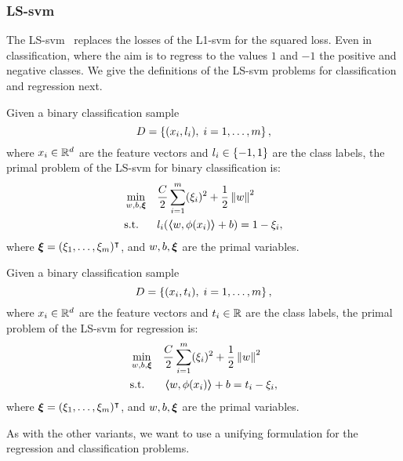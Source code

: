 \subsubsection*{LS-\acrshort{svm}}
%
The LS-\acrshort{svm}~\citep{SuykensV99} replaces the losses of the L1-\acrshort{svm} for the squared loss.
Even in classification, where the aim is to regress to the values $1$ and $-1$ the positive and negative classes.
%
We give the definitions of the LS-\acrshort{svm} problems for classification and regression next.
\begin{definition}
    Given a binary classification sample
    $$ D = \left\{(x_i, l_i), \; i=1, \ldots, m\right\} ,$$
    where $x_i \in \mathbb{R}^d$ are the feature vectors and $l_i \in \left\{-1, 1\right\}$ are the class labels, 
    the primal problem of the LS-\acrshort{svm} for binary classification is:
    \begin{equation}
        \label{eq:ls_primal_clas}
        \begin{aligned}
            &\min_{w, b, \fv{\xi}} & & \frac{C}{2} \sum_{i=1}^m (\xi_i)^2 + \frac{1}{2} \norm{w}^2 \\
            & \text{s.t.} & & l_i (\dotp{w}{\phi(x_i)} + b) = 1 - \xi_i , 
        \end{aligned}  
    \end{equation}
    where $\bm{\xi} = (\xi_1, \ldots, \xi_m)^\intercal$, and $w, b, \bm{\xi}$ are the primal variables.
\end{definition}
%
\begin{definition}
    Given a binary classification sample
    $$ D = \left\{(x_i, t_i), \; i=1, \ldots, m\right\} ,$$
    where $x_i \in \mathbb{R}^d$ are the feature vectors and $t_i \in \mathbb{R}$ are the class labels, 
    the primal problem of the LS-\acrshort{svm} for regression is:
    \begin{equation}
        \label{eq:ls_primal_reg}
        \begin{aligned}
            &\min_{w, b, \fv{\xi}} & & \frac{C}{2} \sum_{i=1}^m (\xi_i)^2 + \frac{1}{2} \norm{w}^2 \\
            & \text{s.t.} & & \dotp{w}{\phi(x_i)} + b = t_i - \xi_i  , \\
        \end{aligned}  
    \end{equation}
    where $\bm{\xi} = (\xi_1, \ldots, \xi_m)^\intercal$, and $w, b, \bm{\xi}$ are the primal variables.
\end{definition}
%
As with the other variants, we want to use a unifying formulation for the regression and classification problems.

